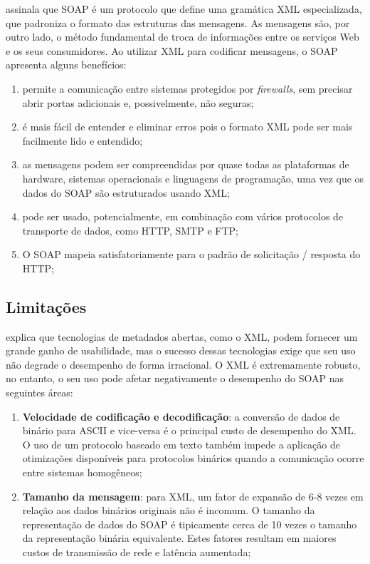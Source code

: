  assinala que SOAP é um protocolo que define uma gramática XML especializada, que padroniza o formato das estruturas das mensagens. As mensagens são, por outro lado, o método fundamental de troca de informações entre os serviços Web e os seus consumidores. Ao utilizar XML para codificar mensagens,  o SOAP apresenta alguns benefícios:

\begin{enumerate}[label=\alph*)]

\item permite a comunicação entre sistemas protegidos por \textit{firewalls}, sem precisar abrir portas adicionais e, possivelmente, não seguras;

\item é mais fácil de entender e eliminar erros pois o formato XML pode ser mais facilmente lido e entendido;

\item as mensagens podem ser compreendidas por quase todas as plataformas de hardware, sistemas operacionais e linguagens de programação, uma vez que os dados do SOAP são estruturados usando XML;

\item pode ser usado, potencialmente, em combinação com vários protocolos de transporte de dados, como HTTP, SMTP e FTP;

\item O SOAP mapeia satisfatoriamente para o padrão de solicitação / resposta do HTTP;

\end{enumerate}

\subsection{Limitações}

 explica que tecnologias de metadados abertas, como o XML, podem fornecer um grande ganho de usabilidade, mas o sucesso dessas tecnologias exige que seu uso não degrade o desempenho de forma irracional. O XML é extremamente robusto, no entanto, o seu uso pode afetar negativamente o desempenho do SOAP nas seguintes áreas:

\begin{enumerate}[label=\alph*)]

    \item \textbf{Velocidade de codificação e decodificação}: a conversão de dados de binário para ASCII e vice-versa é o principal custo de desempenho do XML. O uso de um protocolo baseado em texto também impede a aplicação de otimizações disponíveis para protocolos binários quando a comunicação ocorre entre sistemas homogêneos;
    
    \item \textbf{Tamanho da mensagem}: para XML, um fator de expansão de 6-8 vezes em relação aos dados binários originais não é incomum. O tamanho da representação de dados do SOAP é tipicamente cerca de 10 vezes o tamanho da representação binária equivalente. Estes fatores resultam em maiores custos de transmissão de rede e latência aumentada;
    
\end{enumerate}

